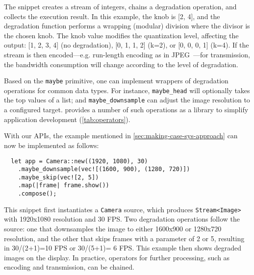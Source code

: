 The snippet creates a stream of integers, chains a degradation operation, and
collects the execution result. In this example, the knob is [2, 4], and the
degradation function performs a wrapping (modular) division where the divisor is
the chosen knob. The knob value modifies the quantization level, affecting the
output: [1, 2, 3, 4] (no degradation), [0, 1, 1, 2] (k=2), or [0, 0, 0, 1]
(k=4). If the stream is then encoded---e.g. run-length encoding as in
JPEG~\cite{wallace1992jpeg}---for transmission, the bandwidth consumption will
change according to the level of degradation.

Based on the \texttt{maybe} primitive, one can implement wrappers of degradation
operations for common data types. For instance, \texttt{maybe\_head} will
optionally takes the top values of a list; and \texttt{maybe\_downsample} can
adjust the image resolution to a configured target. \sysname{} provides a number
of such operations as a library to simplify application development
(\autoref{tab:operators}).

With our APIs, the example mentioned in \autoref{sec:making-case-sys-approach}
can now be implemented as follows:

\vspace{-2pt}
\begin{lstlisting}
  let app = Camera::new((1920, 1080), 30)
    .maybe_downsample(vec![(1600, 900), (1280, 720)])
    .maybe_skip(vec![2, 5])
    .map(|frame| frame.show())
    .compose();
\end{lstlisting}

This snippet first instantiates a \texttt{Camera} source, which produces
\texttt{Stream<Image>} with 1920x1080 resolution and 30 FPS\@. Two degradation
operations follow the source: one that downsamples the image to either 1600x900 or
1280x720 resolution, and the other that skips frames with a parameter of 2 or 5, resulting
in 30/(2+1)=10 FPS or 30/(5+1)= 6 FPS\@. This example then shows degraded images
on the display. In practice, operators for further processing, such as encoding and
transmission, can be chained.

